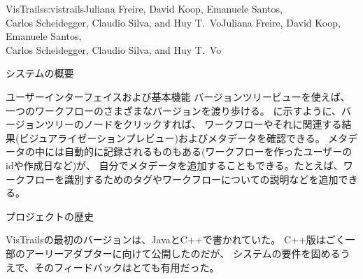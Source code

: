 \begin{aosachaptertoc}{VisTrails}{s:vistrails}{Juliana Freire, David Koop, Emanuele Santos, \\ Carlos Scheidegger, Claudio Silva, and Huy T.\ Vo}{Juliana Freire, David Koop, Emanuele Santos, \\ \hspace*{0.9cm} Carlos Scheidegger, Claudio Silva, and Huy T.\ Vo}
\begin{aosasect1}{システムの概要}
\begin{aosasect2}{ユーザーインターフェイスおよび基本機能}
バージョンツリービューを使えば、一つのワークフローのさまざまなバージョンを渡り歩ける。
に示すように、バージョンツリーのノードをクリックすれば、
ワークフローやそれに関連する結果(ビジュアライゼーションプレビュー)およびメタデータを確認できる。
メタデータの中には自動的に記録されるものもある(ワークフローを作ったユーザーのidや作成日など)が、
自分でメタデータを追加することもできる。たとえば、ワークフローを識別するためのタグやワークフローについての説明などを追加できる。


\end{aosasect2}

\end{aosasect1}

\begin{aosasect1}{プロジェクトの歴史}

VisTrailsの最初のバージョンは、JavaとC++で書かれていた\cite{bib:bavoil:vistrails}。
C++版はごく一部のアーリーアダプターに向けて公開したのだが、
システムの要件を固めるうえで、そのフィードバックはとても有用だった。


\end{aosasect1}
\end{aosachaptertoc}
